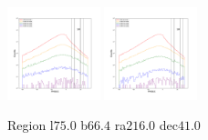 \documentclass[12pt,prd]{article}
\begin{document}
\begin{figure}[h!]
\includegraphics[width=0.24\textwidth]{../figures/scanning_plotsgaiascan_l75_0_b66_4_ra216_0_dec41_0_npy_16.pdf}
\includegraphics[width=0.24\textwidth]{../figures/scanning_plotsgaiascan_l75_0_b66_4_ra216_0_dec41_0_npy_17.pdf}
\caption{Region l$75.0$ b$66.4$ ra$216.0$ dec$41.0$}
\end{figure}
\end{document}
